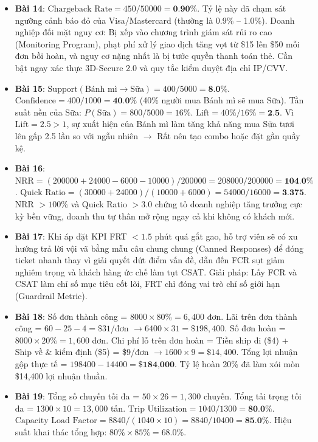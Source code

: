 \begin{dapanbox}
\begin{itemize}
    \item \textbf{Bài 14}: $\text{Chargeback Rate} = 450 / 50000 = \textbf{0.90\%}$. Tỷ lệ này đã chạm sát ngưỡng cảnh báo đỏ của Visa/Mastercard (thường là 0.9\% -- 1.0\%). Doanh nghiệp đối mặt nguy cơ: Bị xếp vào chương trình giám sát rủi ro cao (Monitoring Program), phạt phí xử lý giao dịch tăng vọt từ \$15 lên \$50 mỗi đơn bồi hoàn, và nguy cơ nặng nhất là bị tước quyền thanh toán thẻ. Cần bật ngay xác thực 3D-Secure 2.0 và quy tắc kiểm duyệt địa chỉ IP/CVV.
    \item \textbf{Bài 15}: $\text{Support}(\text{Bánh mì} \rightarrow \text{Sữa}) = 400 / 5000 = \textbf{8.0\%}$. $\text{Confidence} = 400 / 1000 = \textbf{40.0\%}$ (40\% người mua Bánh mì sẽ mua Sữa). Tần suất nền của Sữa: $P(\text{Sữa}) = 800 / 5000 = 16\%$. $\text{Lift} = 40\% / 16\% = \textbf{2.5}$. Vì $\text{Lift} = 2.5 > 1$, sự xuất hiện của Bánh mì làm tăng khả năng mua Sữa tươi lên gấp 2.5 lần so với ngẫu nhiên $\rightarrow$ Rất nên tạo combo hoặc đặt gần quầy kệ.
    \item \textbf{Bài 16}: $\text{NRR} = (200000 + 24000 - 6000 - 10000) / 200000 = 208000 / 200000 = \textbf{104.0\%}$. $\text{Quick Ratio} = (30000 + 24000) / (10000 + 6000) = 54000 / 16000 = \textbf{3.375}$. NRR $> 100\%$ và Quick Ratio $> 3.0$ chứng tỏ doanh nghiệp tăng trưởng cực kỳ bền vững, doanh thu tự thân mở rộng ngay cả khi không có khách mới.
    \item \textbf{Bài 17}: Khi áp đặt KPI FRT $< 1.5$ phút quá gắt gao, hỗ trợ viên sẽ có xu hướng trả lời vội vã bằng mẫu câu chung chung (Canned Responses) để đóng ticket nhanh thay vì giải quyết dứt điểm vấn đề, dẫn đến FCR sụt giảm nghiêm trọng và khách hàng ức chế làm tụt CSAT. Giải pháp: Lấy FCR và CSAT làm chỉ số mục tiêu cốt lõi, FRT chỉ đóng vai trò chỉ số giới hạn (Guardrail Metric).
    \item \textbf{Bài 18}: Số đơn thành công = $8000 \times 80\% = 6,400$ đơn. Lãi trên đơn thành công = $60 - 25 - 4 = \$31$/đơn $\rightarrow 6400 \times 31 = \$198,400$. Số đơn hoàn = $8000 \times 20\% = 1,600$ đơn. Chi phí lỗ trên đơn hoàn = Tiền ship đi (\$4) + Ship về \& kiểm định (\$5) = \$9/đơn $\rightarrow 1600 \times 9 = \$14,400$. Tổng lợi nhuận gộp thực tế = $198400 - 14400 = \textbf{\$184,000}$. Tỷ lệ hoàn 20\% đã làm xói mòn \$14,400 lợi nhuận thuần.
    \item \textbf{Bài 19}: Tổng số chuyến tối đa = $50 \times 26 = 1,300$ chuyến. Tổng tải trọng tối đa = $1300 \times 10 = 13,000$ tấn. $\text{Trip Utilization} = 1040 / 1300 = \textbf{80.0\%}$. $\text{Capacity Load Factor} = 8840 / (1040 \times 10) = 8840 / 10400 = \textbf{85.0\%}$. Hiệu suất khai thác tổng hợp: $80\% \times 85\% = 68.0\%$.

\end{itemize}
\end{dapanbox}
